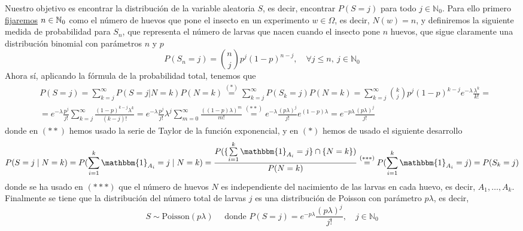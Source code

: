 \begin{ejercicio}
    \noindent
    Nuestro objetivo es encontrar la distribución de la variable aleatoria $S$, es decir, encontrar $P(S=j)$ para todo $j \in \mathbb{N}_0$. Para ello primero \underline{fijaremos} $n\in \mathbb{N}_0$ como el número de huevos que pone el insecto en un experimento $w \in \Omega$, es decir, $N(w) = n$, y definiremos la siguiente medida de probabilidad para $S_n$, que representa el número de larvas que nacen cuando el insecto pone $n$ huevos, que sigue claramente una distribución binomial con parámetros $n$ y $p$
    \begin{equation*}
        P(S_n=j) = \binom{n}{j} p^j (1-p)^{n-j}, \quad \forall j\leq n, \ j \in \mathbb{N}_0
    \end{equation*}
    Ahora sí, aplicando la fórmula de la probabilidad total, tenemos que
    \begin{align*}
        & P(S=j)  = \sum\limits_{k=j}^{\infty} P(S=j | N=k) P(N=k)\overset{(*)}{=} \sum\limits_{k=j}^{\infty} P(S_k=j) P(N=k) = \sum\limits_{k=j}^{\infty} \binom{k}{j} p^j (1-p)^{k-j} e^{-\lambda} \frac{\lambda^k}{k!} = \\
        & = e^{-\lambda} \frac{p^j}{j!} \sum\limits_{k=j}^{\infty} \frac{(1-p)^{k-j} \lambda^k}{(k-j)!} = e^{-\lambda} \frac{p^j}{j!} \lambda^j \sum\limits_{m=0}^{\infty} \frac{((1-p)\lambda)^m}{m!} \overset{(**)}{=} e^{-\lambda} \frac{(p\lambda)^j}{j!} e^{(1-p)\lambda} = e^{-p\lambda} \frac{(p\lambda)^j}{j!}
    \end{align*}
    donde en $(**)$ hemos usado la serie de Taylor de la función exponencial, y en $(*)$ hemos de usado el siguiente desarrollo
    \begin{align*}
        P(S=j\mid N=k)=P(\sum\limits_{i=1}^{k} \mathbbm{1}_{A_i} = j\mid N=k)=\dfrac{P(\{\sum\limits_{i=1}^{k} \mathbbm{1}_{A_i} = j\}\cap \{N=k\})}{P(N=k)}\overset{(***)}{=}P(\sum\limits_{i=1}^{k} \mathbbm{1}_{A_i} = j)=P(S_k=j)
    \end{align*}
    donde se ha usado en $(***)$ que el número de huevos $N$ es independiente del nacimiento de las larvas en cada huevo, es decir, $A_1,\ldots, A_k$. Finalmente se tiene que la distribución del número total de larvas $j$ es una distribución de Poisson con parámetro $p\lambda$, es decir,
    \begin{equation*}
        S \sim \text{Poisson}(p\lambda) \quad \text{ donde } P(S=j) = e^{-p\lambda} \frac{(p\lambda)^j}{j!}, \quad j \in \mathbb{N}_0
    \end{equation*}
\end{ejercicio}


